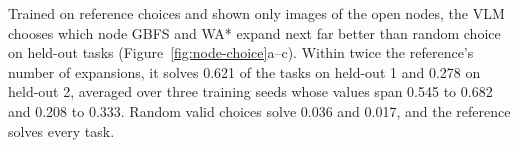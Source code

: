 Trained on reference choices and shown only images of the open nodes, the VLM chooses which node GBFS and WA* expand next far better than random choice on held-out tasks (Figure~\ref{fig:node-choice}a--c). Within twice the reference's number of expansions, it solves 0.621 of the tasks on held-out 1 and 0.278 on held-out 2, averaged over three training seeds whose values span 0.545 to 0.682 and 0.208 to 0.333. Random valid choices solve 0.036 and 0.017, and the reference solves every task.

